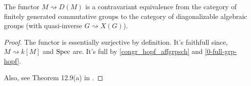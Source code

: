\begin{theorem}
  \label{congr_fggrp_diag}
  The functor $M\rightsquigarrow D(M)$ is a contravariant equivalence
  from the category of finitely generated commutative groups to the category of
  diagonalizable algebraic groups (with quasi-inverse $G \rightsquigarrow X(G)$).
\end{theorem}
\begin{proof}

  The functor is essentially surjective by definition.
  It's faithfull since, $M\rightsquigarrow k[M]$ and $\operatorname{Spec}$ are.
  It's full by \ref{congr_hopf_affgrpsch} and \ref{0-full-grp-hopf}.

  Also, see Theorem 12.9(a) in \cite{Milne_2017}.
\end{proof}
